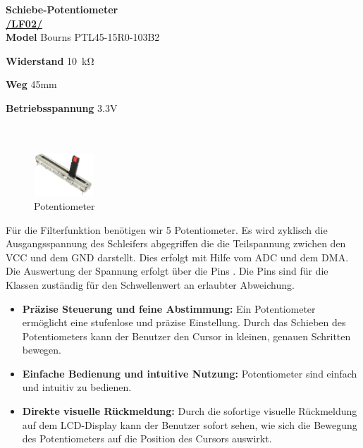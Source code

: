 \textbf{\hypertarget{Potentiometer}{Schiebe-Potentiometer}}\\

\textbf{\hyperlink{LF02_Link}{/LF02/}} \\

\textbf{Model} Bourns PTL45-15R0-103B2

\textbf{Widerstand} \SI{10}{\kilo\ohm}

\textbf{Weg} 45mm

\textbf{Betriebsspannung} 3.3V \\ \\ \\

	\begin{figure} %
	\vspace{-155pt + 0.02\textwidth}
	\hspace{0.07\textwidth} %
	\includegraphics[width=0.2\textwidth]{images/05_technische_spezifikation/Interface/Potentiometer.png} %
	\caption{Potentiometer}
	\label{fig:schiebe_potentiometer}
	\vspace{-20pt}
\end{figure}

Für die Filterfunktion benötigen wir 5 Potentiometer. Es wird zyklisch die Ausgangsspannung des Schleifers abgegriffen die die Teilspannung zwichen den VCC und dem GND darstellt. Dies erfolgt mit Hilfe vom ADC und dem DMA. Die Auswertung der Spannung erfolgt über die Pins  . Die Pins   sind für die Klassen zuständig   für den Schwellenwert an erlaubter Abweichung.

\begin{itemize}
	\item \textbf{Präzise Steuerung und feine Abstimmung:} Ein Potentiometer ermöglicht eine stufenlose und präzise Einstellung. Durch das Schieben des Potentiometers kann der Benutzer den Cursor in kleinen, genauen Schritten bewegen.
	\item \textbf{Einfache Bedienung und intuitive Nutzung:} Potentiometer sind einfach und intuitiv zu bedienen.
	\item \textbf{Direkte visuelle Rückmeldung:} Durch die sofortige visuelle Rückmeldung auf dem LCD-Display kann der Benutzer sofort sehen, wie sich die Bewegung des Potentiometers auf die Position des Cursors auswirkt.
\end{itemize}


